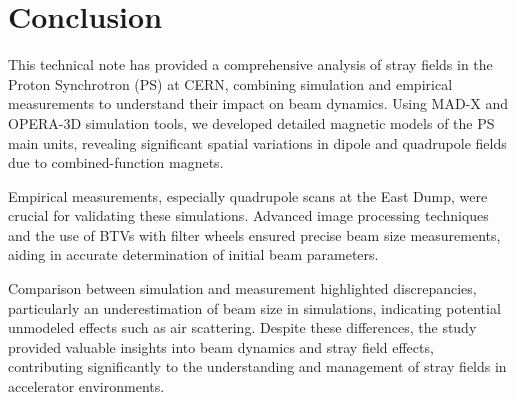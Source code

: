 \documentclass{cernatsnote}
\begin{document}









\section{Conclusion}
This technical note has provided a comprehensive analysis of stray fields in the Proton Synchrotron (PS) at CERN, combining simulation and empirical measurements to understand their impact on beam dynamics. Using MAD-X and OPERA-3D simulation tools, we developed detailed magnetic models of the PS main units, revealing significant spatial variations in dipole and quadrupole fields due to combined-function magnets.

Empirical measurements, especially quadrupole scans at the East Dump, were crucial for validating these simulations. Advanced image processing techniques and the use of BTVs with filter wheels ensured precise beam size measurements, aiding in accurate determination of initial beam parameters.

Comparison between simulation and measurement highlighted discrepancies, particularly an underestimation of beam size in simulations, indicating potential unmodeled effects such as air scattering. Despite these differences, the study provided valuable insights into beam dynamics and stray field effects, contributing significantly to the understanding and management of stray fields in accelerator environments.



\end{document}

